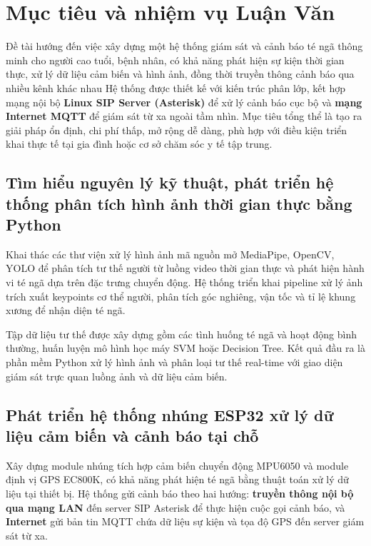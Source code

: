 
\section{Mục tiêu và nhiệm vụ Luận Văn}

Đề tài hướng đến việc xây dựng một hệ thống giám sát và cảnh báo té ngã thông minh cho người cao tuổi, bệnh nhân, có khả năng phát hiện sự kiện thời gian thực, xử lý dữ liệu cảm biến và hình ảnh, đồng thời truyền thông cảnh báo qua nhiều kênh khác nhau Hệ thống được thiết kế với kiến trúc phân lớp, kết hợp mạng nội bộ \textbf{Linux SIP Server (Asterisk)} để xử lý cảnh báo cục bộ và \textbf{mạng Internet MQTT} để giám sát từ xa ngoài tầm nhìn. Mục tiêu tổng thể là tạo ra giải pháp ổn định, chi phí thấp, mở rộng dễ dàng, phù hợp với điều kiện triển khai thực tế tại gia đình hoặc cơ sở chăm sóc y tế tập trung.

\subsection{Tìm hiểu nguyên lý kỹ thuật, phát triển hệ thống phân tích hình ảnh thời gian thực bằng Python}

Khai thác các thư viện xử lý hình ảnh mã nguồn mở MediaPipe, OpenCV, YOLO để phân tích tư thế người từ luồng video thời gian thực và phát hiện hành vi té ngã dựa trên đặc trưng chuyển động. Hệ thống triển khai pipeline xử lý ảnh trích xuất keypoints cơ thể người, phân tích góc nghiêng, vận tốc và tỉ lệ khung xương để nhận diện té ngã.

Tập dữ liệu tư thế được xây dựng gồm các tình huống té ngã và hoạt động bình thường, huấn luyện mô hình học máy SVM hoặc Decision Tree. Kết quả đầu ra là phần mềm Python xử lý hình ảnh và phân loại tư thế real-time với giao diện giám sát trực quan luồng ảnh và dữ liệu cảm biến.

\subsection{Phát triển hệ thống nhúng ESP32 xử lý dữ liệu cảm biến và cảnh báo tại chỗ}

Xây dựng module nhúng tích hợp cảm biến chuyển động MPU6050 và module định vị GPS EC800K, có khả năng phát hiện té ngã bằng thuật toán xử lý dữ liệu tại thiết bị. Hệ thống gửi cảnh báo theo hai hướng: \textbf{truyền thông nội bộ qua mạng LAN} đến server SIP Asterisk để thực hiện cuộc gọi cảnh báo, và \textbf{Internet} gửi bản tin MQTT chứa dữ liệu sự kiện và tọa độ GPS đến server giám sát từ xa.

